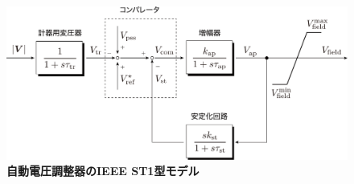 \documentclass[tombow,dvipdfmx]{corona-a5-1.1}
\begin{document}
%

\begin{figure}[t]
\centering
\includegraphics[width = .85\linewidth]{figs/avrst1}
\medskip
\caption{\textbf{自動電圧調整器のIEEE ST1型モデル}}
\label{fig:avrst1}
\medskip
\end{figure}
\end{document}
